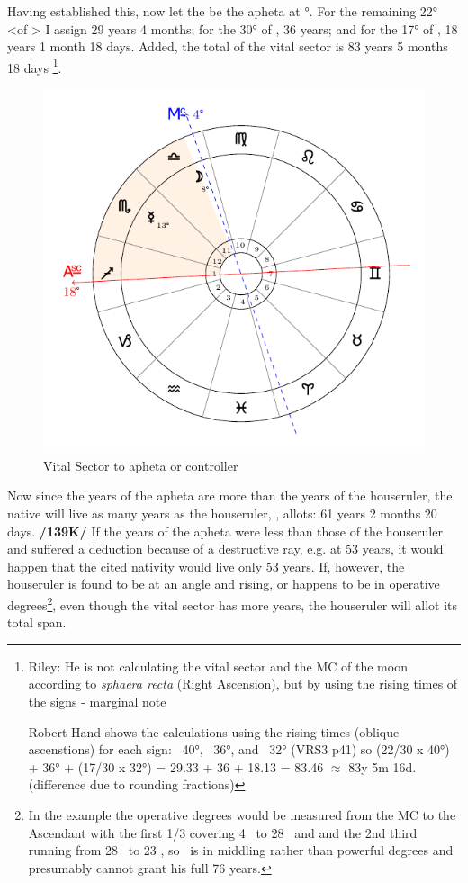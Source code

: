 Having established this, now let the \Moon\xspace be the apheta at \Libra\xspace 8°. For the remaining 22° <of \Libra> I assign 29 years 4 months; for the 30° of \Scorpio, 36 years; and for the 17° of \Sagittarius, 18 years 1 month 18 days. Added, the total of the vital sector is 83 years 5 months 18 days
\footnote{Riley: He is not calculating the vital sector and the MC of the moon according to \textsl{sphaera recta} (Right Ascension), but by using the rising times of the signs - marginal note

Robert Hand shows the calculations using the rising times (oblique ascenstions) for each sign: \Libra\, 40°, \Scorpio\, 36°, and \Sagittarius\, 32° (VRS3 p41) so (22/30 x 40°) + 36° + (17/30 x 32°) = 29.33 + 36 + 18.13 = 83.46 $\approx$ 83y 5m 16d. (difference due to rounding fractions)}.

\begin{figure}[H]
\centering
\includegraphics[width=.7\textwidth]{charts/3_03_2a}
\caption{Vital Sector to apheta or controller}
\end{figure}

Now since the years of the apheta are more than the years of the houseruler, the native will live as many years as the
houseruler, \Mercury, allots: 61 years 2 months 20 days. \textbf{/139K/} If the years of the apheta were less than
those of the houseruler and suffered a deduction because of a destructive ray, e.g. at 53 years, it would happen that the cited nativity would live only 53 years. If, however, the houseruler is found to be at an angle and rising, or happens to be in operative degrees\footnote{In the example the operative degrees would be measured from the MC to the Ascendant with the first 1/3 covering 4 \Libra\, to 28 \Libra\, and and the 2nd third running from 28 \Libra\, to 23 \Scorpio, so \Mercury\, is in middling rather than powerful degrees and presumably cannot grant his full 76 years.}, even though the vital sector has more years, the houseruler will allot its total span. 

